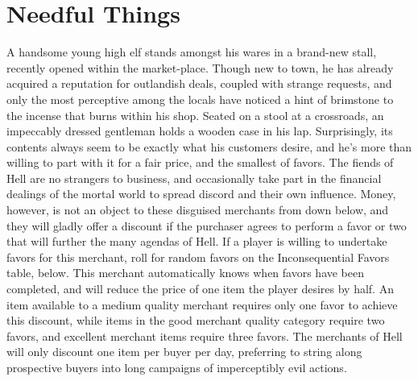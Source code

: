 \documentclass[10pt,a4paper,twoside,twocolumn,openany,nodeprecatedcode,bg=print]{dndbook}
\begin{document}
\section{Needful Things}
A handsome young high elf stands amongst his wares in a brand-new stall, recently opened within the market-place. Though new to town, he has already acquired a reputation for outlandish deals, coupled with strange requests, and only the most perceptive among the locals have noticed a hint of brimstone to the incense that burns within his shop.
Seated on a stool at a crossroads, an impeccably dressed gentleman holds a wooden case in his lap. Surprisingly, its contents always seem to be exactly what his customers desire, and he's more than willing to part with it for a fair price, and the smallest of favors.
The fiends of Hell are no strangers to business, and occasionally take part in the financial dealings of the mortal world to spread discord and their own influence. Money, however, is not an object to these disguised merchants from down below, and they will gladly offer a discount if the purchaser agrees to perform a favor or two that will further the many agendas of Hell.
If a player is willing to undertake favors for this merchant, roll for random favors on the Inconsequential Favors table, below. This merchant automatically knows when favors have been completed, and will reduce the price of one item the player desires by half. An item available to a medium quality merchant requires only one favor to achieve this discount, while items in the good merchant quality category require two favors, and excellent merchant items require three favors. The merchants of Hell will only discount one item per buyer per day, preferring to string along prospective buyers into long campaigns of imperceptibly evil actions.
\end{document}
